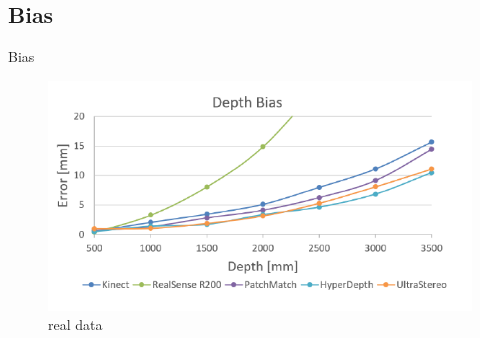 \subsection{Bias}
\begin{frame}{Bias}
\begin{figure}
\centering
\includegraphics[scale=1]{pictures/fig_4_depth_bias_real_data}
\caption{real data}
\end{figure}
\end{frame}


